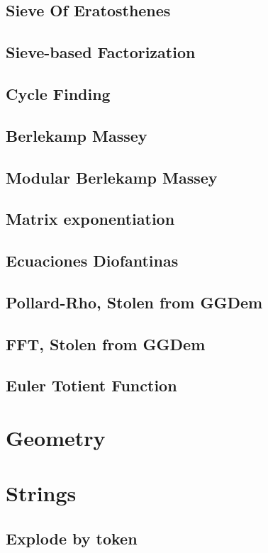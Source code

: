\subsection{Sieve Of Eratosthenes}
\subsection{Sieve-based Factorization}
\subsection{Cycle Finding}
\subsection{Berlekamp Massey}
\subsection{Modular Berlekamp Massey}
\subsection{Matrix exponentiation}
\subsection{Ecuaciones Diofantinas}
\subsection{Pollard-Rho, Stolen from GGDem}
\subsection{FFT, Stolen from GGDem}
\subsection{Euler Totient Function}
\section{Geometry}


\section{Strings}
\subsection{Explode by token}
